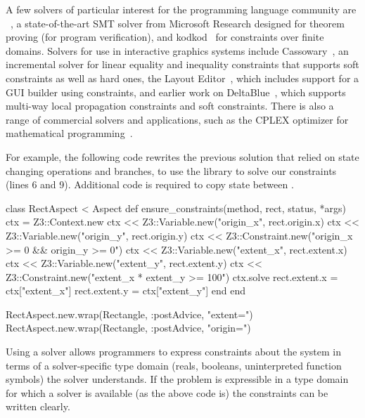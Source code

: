 A few solvers of particular interest for the programming language
community are \zthree~\cite{de2008z3}, a state-of-the-art SMT solver
from Microsoft Research designed for theorem proving (\eg for program
verification), and kodkod~\cite{torlak2007kodkod} for constraints over
finite domains.  Solvers for use in interactive graphics systems
include Cassowary~\cite{badros-tochi-2001}, an incremental solver for
linear equality and inequality constraints that supports soft
constraints as well as hard ones, the \DIFdelbegin {}\DIFdelend \DIFaddbegin {}\DIFaddend Layout
Editor~\cite{lutteroth2008end}, which includes support for a GUI
builder using constraints, and earlier work on
DeltaBlue~\cite{freeman-benson-phoenix-1989}, which supports multi-way
local propagation constraints and soft constraints.  There is also a
range of commercial solvers and applications, such as the CPLEX
optimizer for mathematical programming~\cite{optimization1993using}.

For example, the following code rewrites the previous solution that
relied on state changing operations and branches, to use the \zthree
library to solve our constraints (lines 6 and 9). Additional code is
required to copy state between \DIFdelbegin {}\DIFdelend \DIFaddbegin {}\DIFaddend .
\begin{code}
class RectAspect < Aspect
  def ensure_constraints(method, rect, status, *args)
    ctx = Z3::Context.new
    ctx << Z3::Variable.new("origin_x", rect.origin.x)
    ctx << Z3::Variable.new("origin_y", rect.origin.y)
    ctx << Z3::Constraint.new("origin_x >= 0 && origin_y >= 0")
    ctx << Z3::Variable.new("extent_x", rect.extent.x)
    ctx << Z3::Variable.new("extent_y", rect.extent.y)
    ctx << Z3::Constraint.new("extent_x * extent_y >= 100")
    ctx.solve
    rect.extent.x = ctx["extent_x"]
    rect.extent.y = ctx["extent_y"]
  end
end

RectAspect.new.wrap(Rectangle, :postAdvice, "extent=")
RectAspect.new.wrap(Rectangle, :postAdvice, "origin=")
\end{code}

Using a solver allows programmers to express constraints about the
system in terms of a solver-specific type domain (\eg reals, booleans,
uninterpreted function symbols) the solver understands. If the problem
is expressible in a type domain for which a solver is available (as
the above code is) the constraints can be written clearly.

